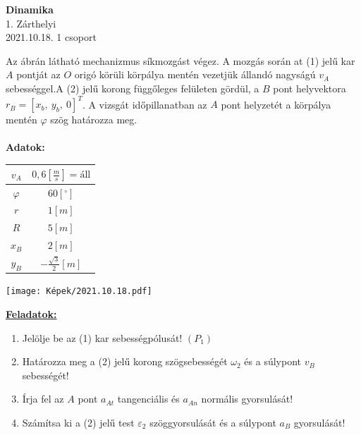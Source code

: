 \documentclass[11pt,a4paper]{article}
\begin{document}
\begin{center}
    \textbf{\LARGE{Dinamika}}\\
    1. Zárthelyi\\
    2021.10.18. 1 csoport
\end{center}
Az ábrán látható mechanizmus síkmozgást végez. A mozgás során at (1) jelű kar $A$ pontját az $O$ origó körüli körpálya mentén vezetjük állandó nagyságú $v_A$ sebességgel.A (2) jelű korong függőleges felületen gördül, a $B$ pont helyvektora $r_B = [x_b,\ y_b,\ 0]^T$. A vizsgát időpillanatban az $A$ pont helyzetét a körpálya mentén $\varphi$ szög határozza meg.\\\\
\textbf{Adatok:}\\
\begin{tabular}{| c | c |}
    \hline
    $v_A $&$ 0,6 \left[\frac{m}{s}\right] = \text{áll}$\\
    \hline
    $\varphi $&$ 60 [^\circ]$\\
    \hline
    $r $&$ 1 [m]$\\
    \hline
    $R $&$ 5 [m]$\\
    \hline
    $x_B $&$ 2 [m]$\\
    \hline
    $y_B $&$ -\frac{\sqrt{3}}{2} [m]$\\
    \hline
\end{tabular}
\begin{center}
    \texttt{[image: Képek/2021.10.18.pdf]}
\end{center}

\underline{\textbf{Feladatok:}}
\begin{enumerate}
    \item Jelölje be az (1) kar sebességpólusát! $(P_1)$
    \item Határozza meg a (2) jelű korong szögsebességét $\omega_2$ és a súlypont $v_B$ sebességét!
    \item Írja fel az $A$ pont $a_{At}$ tangenciális és $a_{An}$ normális gyorsulását!
    \item Számítsa ki a (2) jelű test $\varepsilon_2$ szöggyorsulását és a súlypont $a_B$ gyorsulását!
\end{enumerate}
\end{document}
